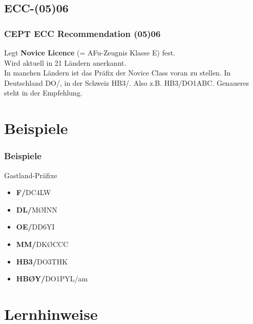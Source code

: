 \subsection{ECC-(05)06}

\begin{frame}
  \frametitle{CEPT ECC Recommendation (05)06}

  Legt \textbf{Novice Licence} (= AFu-Zeugnis Klasse E) fest. \\[2em]

  Wird aktuell in 21 Ländern anerkannt.\\[2em]

  In manchen Ländern ist das Präfix der Novice Class voran zu stellen. In
  Deutschland DO/, in der Schweiz HB3/. Also z.B. HB3/DO1ABC. Genaueres steht
  in der Empfehlung.

\end{frame}

\section{Beispiele}

\begin{frame}
  \frametitle{Beispiele}
  \begin{exampleblock}{Gastland-Präfixe}
    \begin{itemize}
      \item \textbf{F/}DC4LW
      \item \textbf{DL/}M\O INN
      \item \textbf{OE/}DD6YI
      \item \textbf{MM/}DK\O CCC
      \item \textbf{HB3/}DO3THK
      \item \textbf{HB\O Y/}DO1PYL/am
    \end{itemize}
  \end{exampleblock}
\end{frame}

\section{Lernhinweise}

